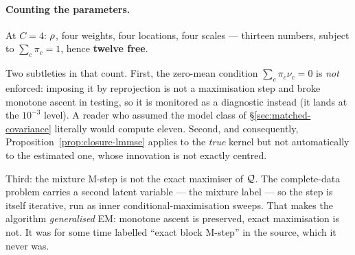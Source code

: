 \paragraph{Counting the parameters.} At $C=4$: $\rho$, four weights, four locations, four
scales --- thirteen numbers, subject to $\sum_c\pi_c=1$, hence \textbf{twelve free}.

\begin{pitfall}
Two subtleties in that count. First, the zero-mean condition $\sum_c\pi_c\nu_c=0$ is
\emph{not} enforced: imposing it by reprojection is not a maximisation step and broke monotone
ascent in testing, so it is monitored as a diagnostic instead (it lands at the $10^{-3}$
level). A reader who assumed the model class of \S\ref{sec:matched-covariance} literally would
compute eleven. Second, and consequently, Proposition~\ref{prop:closure-lmmse} applies to the
\emph{true} kernel but not automatically to the estimated one, whose innovation is not exactly
centred.

Third: the mixture M-step is not the exact maximiser of $\mathcal{Q}$. The complete-data problem
carries a second latent variable --- the mixture label --- so the step is itself iterative, run
as inner conditional-maximisation sweeps. That makes the algorithm \emph{generalised} EM:
monotone ascent is preserved, exact maximisation is not. It was for some time labelled
``exact block M-step'' in the source, which it never was.
\end{pitfall}

